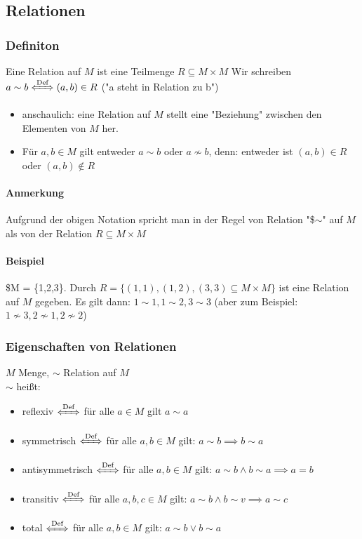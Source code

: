 \documentclass[a4paper]{scrartcl}
\theoremstyle{definition}
\theoremstyle{plain}
\theoremstyle{plain}
\theoremstyle{remark}
\theoremstyle{remark}
\theoremstyle{remark}
\theoremstyle{remark}
\theoremstyle{remark}
\begin{document}
\subsection{Relationen}
\label{sec-2-5}
\subsubsection{Definiton}
\label{sec-2-5-1}
Eine Relation auf $M$ ist eine Teilmenge $R\subseteq M\times M$
Wir schreiben $a\sim b \xLeftrightarrow{\text{Def}} (a,b) \in R$ ("a steht in Relation zu b")

\begin{itemize}
\item anschaulich: eine Relation auf $M$ stellt eine "Beziehung" zwischen den Elementen von $M$ her.
\item Für $a,b \in M$ gilt entweder $a\sim b$ oder $a\not\sim b$, denn: entweder ist $(a,b) \in R$ oder $(a,b)\not\in R$
\end{itemize}
\paragraph{Anmerkung}
\label{sec-2-5-1-1}
Aufgrund der obigen Notation spricht man in der Regel von Relation "\$$\sim$" auf $M$ als von der Relation $R \subseteq M\times M$
\paragraph{Beispiel}
\label{sec-2-5-1-2}
\$M = \{1,2,3\}. Durch $R = \{(1,1), (1,2), (3,3) \subseteq M\times M\}$ ist eine Relation auf $M$ gegeben. Es gilt dann: $1\sim 1, 1\sim 2, 3\sim 3$ (aber zum Beispiel: $1\not\sim 3, 2\not\sim 1, 2\not\sim 2$)

\subsubsection{Eigenschaften von Relationen}
\label{sec-2-5-2}
$M$ Menge, $\sim$ Relation auf $M$ \\
    $\sim$ heißt:
\begin{itemize}
\item reflexiv $\xLeftrightarrow{\text{Def}}$ für alle $a\in M$ gilt $a\sim a$
\item symmetrisch $\xLeftrightarrow{\text{Def}}$ für alle $a,b\in M$ gilt: $a\sim b \implies b\sim a$
\item antisymmetrisch $\xLeftrightarrow{\text{Def}}$ für alle $a,b \in M$ gilt: $a\sim b \wedge b\sim a \implies a = b$
\item transitiv $\xLeftrightarrow{\text{Def}}$ für alle $a,b,c\in M$ gilt: $a\sim b \wedge b\sim v \implies a\sim c$
\item total $\xLeftrightarrow{\text{Def}}$ für alle $a,b\in M$ gilt: $a\sim b \vee b\sim a$
\end{itemize}
\end{document}
